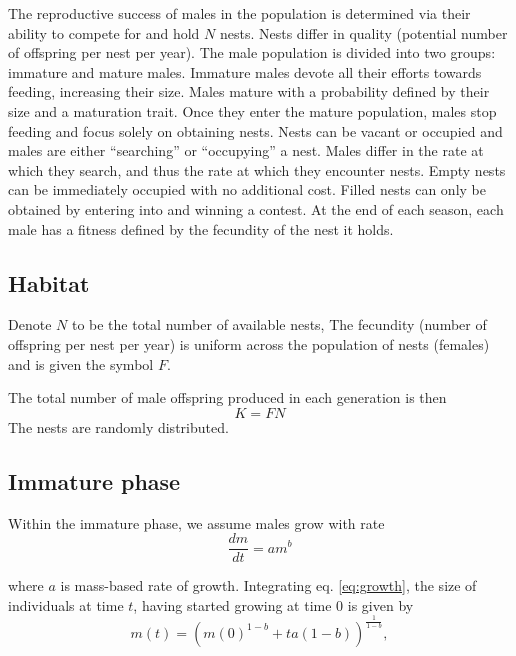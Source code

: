 \documentclass[a4paper,11pt]{article}
\begin{document}
The reproductive success of males in the population is determined via their ability to compete for and hold $N$ nests. Nests differ in quality (potential number of offspring per nest per year). The male population is divided into two groups: immature and mature males. Immature males devote all their efforts towards feeding, increasing their size. Males mature with a probability defined by their size and a maturation trait. Once they enter the mature population, males stop feeding and focus solely on obtaining nests. Nests can be vacant or occupied and males are either ``searching'' or ``occupying'' a nest. Males differ in the rate at which they search, and thus the rate at which they encounter nests. Empty nests can be immediately occupied with no additional cost. Filled nests can only be obtained by entering into and winning a contest. At the end of each season, each male has a fitness defined by the fecundity of the nest it holds.

\subsection{Habitat}

Denote $N$ to be the total number of available nests, The fecundity (number of offspring per nest per year) is uniform across the population of nests (females) and is given the symbol $F$.

The total number of male offspring produced in each generation is then
\begin{equation} \label{eq:pdf_F}
    K = F N
\end{equation}
The nests are randomly distributed.

\subsection{Immature phase}

Within the immature phase, we assume males grow with rate
\begin{equation} \label{eq:growth}
    \frac{dm}{dt} = a m^ b
\end{equation}

where $a$ is mass-based rate of growth. Integrating eq. \ref{eq:growth}, the size of individuals at time $t$, having started growing at time $0$ is given by
\begin{equation} \label{eq:growth}
    m(t) = \left(m(0)^{1-b} + t a(1-b)\right)^{\frac1{1-b}},
\end{equation}
\end{document}
